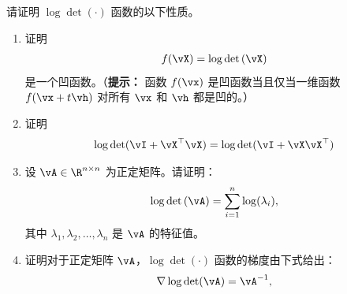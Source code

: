 \documentclass[../../book-main_zh.tex]{subfiles}
\begin{document}
\begin{exercise}
    请证明 $\log\det(\cdot)$ 函数的以下性质。
    \begin{enumerate}
        \item 证明
            \begin{align*}
                f(\vX) = \log\det\left(\vX\right)
            \end{align*}
            是一个凹函数。（{\bf 提示：} 函数 $f(\vx)$ 是凹函数当且仅当一维函数 $f(\vx+t\vh)$ 对所有 $\vx$ 和 $\vh$ 都是凹的。）

        \item 证明
            \begin{align*}
                \log\det(\vI + \vX^\top\vX) = \log\det(\vI + \vX\vX^\top)
            \end{align*}

        \item 设 $\vA \in \R^{n\times n}$ 为正定矩阵。请证明：
            \begin{align}
                \log\det\left(\vA \right) = \sum_{i=1}^n \log(\lambda_i),
            \end{align}
            其中 $\lambda_1,\lambda_2,\dots,\lambda_n$ 是 $\vA$ 的特征值。

        \item  证明对于正定矩阵 $\vA$，$\log\det(\cdot)$ 函数的梯度由下式给出：
            \begin{align*}
                \nabla \log\det(\vA) = \vA^{-1},
            \end{align*}

    \end{enumerate}

\end{exercise}


\end{document}
